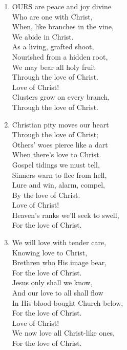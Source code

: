 \begin{enumerate}
    \item OURS are peace and joy divine \\
        Who are one with Christ, \\
        When, like branches in the vine, \\
        We abide in Christ. \\
        As a living, grafted shoot, \\
        Nourished from a hidden root, \\
        We may bear all holy fruit \\
        Through the love of Christ. \\
        Love of Christ! \\
        Clusters grow on every branch, \\
        Through the love of Christ.

    \item Christian pity moves our heart \\
        Through the love of Christ; \\
        Others' woes pierce like a dart \\
        When there's love to Christ. \\
        Gospel tidings we must tell, \\
        Sinners warn to flee from hell, \\
        Lure and win, alarm, compel, \\
        By the love of Christ. \\
        Love of Christ! \\
        Heaven's ranks we'll seek to swell, \\
        For the love of Christ.

    \item We will love with tender care, \\
        Knowing love to Christ, \\
        Brethren who His image bear, \\
        For the love of Christ. \\
        Jesus only shall we know, \\
        And our love to all shall flow \\
        In His blood-bought Church below, \\
        For the love of Christ. \\
        Love of Christ! \\
        We now love all Christ-like ones, \\
        For the love of Christ.


\end{enumerate}
